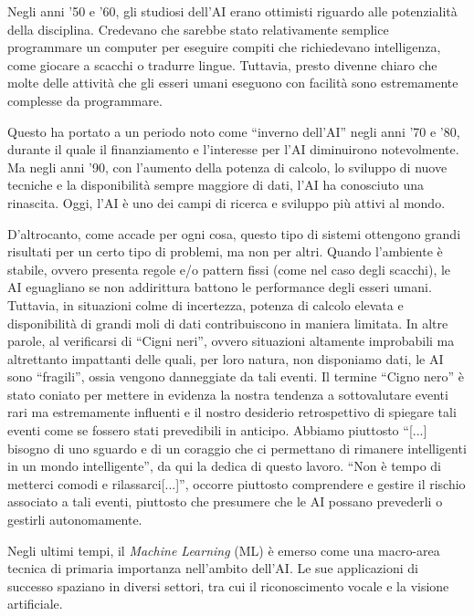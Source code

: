 \documentclass[12pt,a4paper,twoside,openright]{book}
\begin{document}
Negli anni '50 e '60, gli studiosi dell'AI erano ottimisti riguardo alle potenzialità della disciplina. Credevano che sarebbe stato relativamente semplice programmare un computer per eseguire compiti che richiedevano intelligenza, come giocare a scacchi o tradurre lingue. Tuttavia, presto divenne chiaro che molte delle attività che gli esseri umani eseguono con facilità sono estremamente complesse da programmare.

Questo ha portato a un periodo noto come ``inverno dell'AI'' negli anni '70 e '80, durante il quale il finanziamento e l'interesse per l'AI diminuirono notevolmente. Ma negli anni '90, con l'aumento della potenza di calcolo, lo sviluppo di nuove tecniche e la disponibilità sempre maggiore di dati, l'AI ha conosciuto una rinascita. Oggi, l'AI è uno dei campi di ricerca e sviluppo più attivi al mondo.



D'altrocanto, come accade per ogni cosa, questo tipo di sistemi ottengono grandi risultati per un certo tipo di problemi, ma non per altri. Quando l'ambiente è stabile, ovvero presenta regole e/o pattern fissi (come nel caso degli scacchi), le AI eguagliano se non addirittura battono le performance degli esseri umani. Tuttavia, in situazioni colme di incertezza, potenza di calcolo elevata e disponibilità di grandi moli di dati contribuiscono in maniera limitata. In altre parole, al verificarsi di ``Cigni neri''\cite{books/taleb/cigno}, ovvero situazioni altamente improbabili ma altrettanto impattanti delle quali, per loro natura, non disponiamo dati, le AI sono ``fragili'', ossia vengono danneggiate da tali eventi.
Il termine ``Cigno nero'' è stato coniato per mettere in evidenza la nostra tendenza a sottovalutare eventi rari ma estremamente influenti e il nostro desiderio retrospettivo di spiegare tali eventi come se fossero stati prevedibili in anticipo. Abbiamo piuttosto ``[...] bisogno di uno sguardo e di un coraggio che ci permettano di rimanere intelligenti in un mondo intelligente''\cite{books/gigerenzer/intelligenza}, da qui la dedica di questo lavoro. 
``Non è tempo di metterci comodi e rilassarci[...]''\cite{books/gigerenzer/intelligenza}, occorre piuttosto comprendere e gestire il rischio associato a tali eventi, piuttosto che presumere che le AI possano prevederli o gestirli autonomamente.

Negli ultimi tempi, il \emph{Machine Learning} (ML) è emerso come una macro-area tecnica di primaria importanza nell'ambito dell'AI. Le sue applicazioni di successo spaziano in diversi settori, tra cui il riconoscimento vocale e la visione artificiale.
\end{document}
